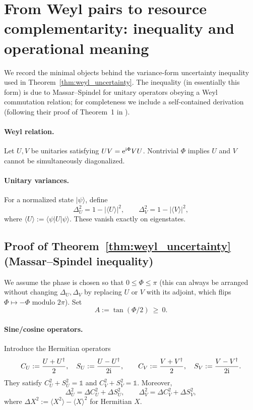 \section{From Weyl pairs to resource complementarity: inequality and operational meaning}
\label{app:weyl_derivation}

We record the minimal objects behind the variance-form uncertainty inequality used in Theorem~\ref{thm:weyl_uncertainty}.
The inequality (in essentially this form) is due to Massar--Spindel \cite{MassarSpindel2008} for unitary operators obeying a Weyl commutation relation; for completeness we include a self-contained derivation (following their proof of Theorem~1 in \cite{MassarSpindel2008}).

\paragraph{Weyl relation.}
Let $U,V$ be unitaries satisfying $UV=\mathrm{e}^{\mathrm{i}\Phi}VU$.
Nontrivial $\Phi$ implies $U$ and $V$ cannot be simultaneously diagonalized.

\paragraph{Unitary variances.}
For a normalized state $|\psi\rangle$, define
\begin{equation}
\Delta_U^2=1-|\langle U\rangle|^2,\qquad \Delta_V^2=1-|\langle V\rangle|^2,
\end{equation}
where $\langle U\rangle:=\langle\psi|U|\psi\rangle$.
These vanish exactly on eigenstates.

\subsection{Proof of Theorem~\ref{thm:weyl_uncertainty} (Massar--Spindel inequality)}
\label{app:weyl_proof}
We assume the phase is chosen so that $0\le \Phi\le \pi$ (this can always be arranged without changing $\Delta_U,\Delta_V$ by replacing $U$ or $V$ with its adjoint, which flips $\Phi\mapsto-\Phi$ modulo $2\pi$).
Set
\begin{equation}
A:=\tan(\Phi/2)\ \ge\ 0.
\end{equation}

\paragraph{Sine/cosine operators.}
Introduce the Hermitian operators
\begin{equation}
C_U:=\frac{U+U^{\dagger}}{2},\quad S_U:=\frac{U-U^{\dagger}}{2\mathrm{i}},
\qquad
C_V:=\frac{V+V^{\dagger}}{2},\quad S_V:=\frac{V-V^{\dagger}}{2\mathrm{i}}.
\label{eq:weyl_sine_cosine}
\end{equation}
They satisfy $C_U^2+S_U^2=\mathds{1}$ and $C_V^2+S_V^2=\mathds{1}$.
Moreover,
\begin{equation}
\Delta_U^2=\Delta C_U^2+\Delta S_U^2,\qquad \Delta_V^2=\Delta C_V^2+\Delta S_V^2,
\end{equation}
where $\Delta X^2:=\langle X^2\rangle-\langle X\rangle^2$ for Hermitian $X$.

